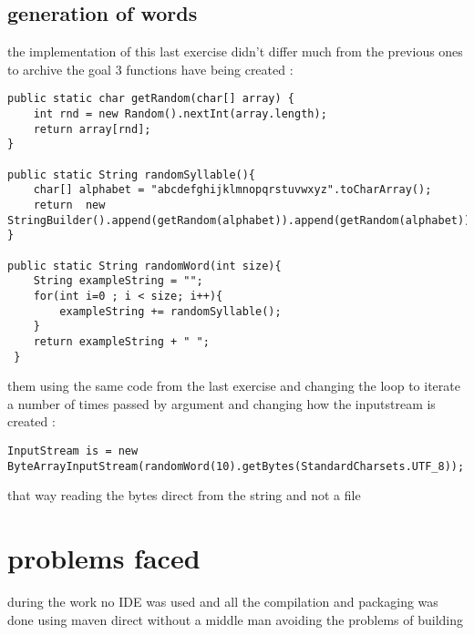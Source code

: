 \documentclass[a4paper]{article}
\begin{document}
\subsection{generation of words}
\label{sec:orgheadline12}
the implementation of this last exercise didn't differ much from the previous ones
to archive the goal 3 functions have being created :

\begin{verbatim}
public static char getRandom(char[] array) {
    int rnd = new Random().nextInt(array.length);
    return array[rnd];
}

public static String randomSyllable(){
    char[] alphabet = "abcdefghijklmnopqrstuvwxyz".toCharArray();
    return  new StringBuilder().append(getRandom(alphabet)).append(getRandom(alphabet)).toString();
}

public static String randomWord(int size){
    String exampleString = "";
    for(int i=0 ; i < size; i++){
        exampleString += randomSyllable();
    }
    return exampleString + " ";
 }
\end{verbatim}

them using the same code from the last exercise and changing the loop to iterate a number of times passed by argument
and changing how the inputstream is created :
\begin{verbatim}
InputStream is = new ByteArrayInputStream(randomWord(10).getBytes(StandardCharsets.UTF_8));
\end{verbatim}
that way reading the bytes direct from the string and not a file


\section{problems faced}
\label{sec:orgheadline14}
during the work no IDE was used and all the compilation and packaging was done using maven direct without a middle man
avoiding the problems of building 
\end{document}
